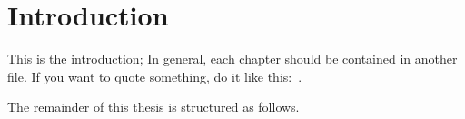 \chapter{Introduction}
This is the introduction; In general, each chapter should be
contained in another file. If you want to quote something, do it like
this:~\cite{peerfactsim}.

The remainder of this thesis is structured as follows.

